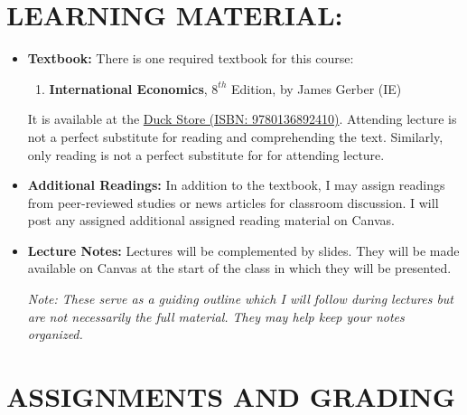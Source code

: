 \documentclass[11pt]{article}
\begin{document}
\section*{LEARNING MATERIAL:}
\begin{itemize}
    \item \textbf{Textbook:} There is one required textbook for this course:
        \begin{enumerate}
            \item \textbf{International Economics}, $8^{th}$ Edition, by James Gerber (IE)
        \end{enumerate}
    It is available at the \href{https://www.uoduckstore.com/book-search-results?crn=15658&term=202401}{Duck Store (ISBN: 9780136892410)}.
    Attending lecture is not a perfect substitute for reading and comprehending the text. 
    Similarly, only reading is not a perfect substitute for for attending lecture. 
    \item \textbf{Additional Readings:} In addition to the textbook, I may assign readings from peer-reviewed studies or news articles for classroom discussion. 
    I will post any assigned additional assigned reading material on Canvas. 
    \item \textbf{Lecture Notes:} Lectures will be complemented by slides. 
    They will be made available on Canvas at the start of the class in which they will be presented. 
    
    \emph{Note: These serve as a guiding outline which I will follow during lectures but are not necessarily the full material. They may help keep your notes organized.}
\end{itemize}

\bigskip 

\section*{ASSIGNMENTS AND GRADING}

%

\bigskip 
\end{document}
